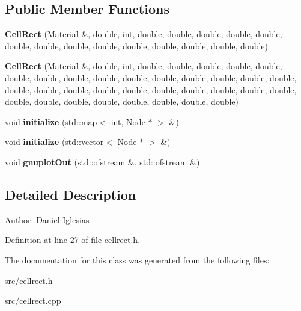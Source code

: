 \subsection*{Public Member Functions}
\begin{CompactItemize}
\item 
\hypertarget{classmknix_1_1CellRect_33f144e168d57e879338574cb0f43c39}{
\textbf{CellRect} (\hyperlink{classmknix_1_1Material}{Material} \&, double, int, double, double, double, double, double, double, double, double, double, double, double, double, double, double)}
\label{classmknix_1_1CellRect_33f144e168d57e879338574cb0f43c39}

\item 
\hypertarget{classmknix_1_1CellRect_b31388dee2b2ab6f959defdcd3b2e834}{
\textbf{CellRect} (\hyperlink{classmknix_1_1Material}{Material} \&, double, int, double, double, double, double, double, double, double, double, double, double, double, double, double, double, double, double, double, double, double, double, double, double, double, double, double, double, double, double, double, double, double, double, double)}
\label{classmknix_1_1CellRect_b31388dee2b2ab6f959defdcd3b2e834}

\item 
\hypertarget{classmknix_1_1CellRect_561ff2e21b08df2f3fb6f5d3bcd1f1fc}{
void \textbf{initialize} (std::map$<$ int, \hyperlink{classmknix_1_1Node}{Node} $\ast$ $>$ \&)}
\label{classmknix_1_1CellRect_561ff2e21b08df2f3fb6f5d3bcd1f1fc}

\item 
\hypertarget{classmknix_1_1CellRect_599daac72085b935a90afe8ffcecdd20}{
void \textbf{initialize} (std::vector$<$ \hyperlink{classmknix_1_1Node}{Node} $\ast$ $>$ \&)}
\label{classmknix_1_1CellRect_599daac72085b935a90afe8ffcecdd20}

\item 
\hypertarget{classmknix_1_1CellRect_ff6050da82b250a264f856743b0225e0}{
void \textbf{gnuplotOut} (std::ofstream \&, std::ofstream \&)}
\label{classmknix_1_1CellRect_ff6050da82b250a264f856743b0225e0}

\end{CompactItemize}


\subsection{Detailed Description}
\begin{Desc}
\item[Author:]Daniel Iglesias \end{Desc}


Definition at line 27 of file cellrect.h.

The documentation for this class was generated from the following files:\begin{CompactItemize}
\item 
src/\hyperlink{cellrect_8h}{cellrect.h}\item 
src/cellrect.cpp\end{CompactItemize}

